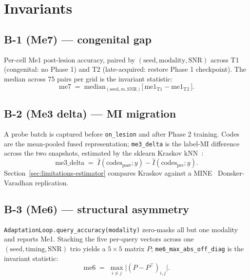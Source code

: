 \documentclass{article}
\begin{document}

\section{Invariants}
\label{sec:invariants}

\subsection{B-1 (Me7) --- congenital gap}

Per-cell Me1 post-lesion accuracy, paired by
$(\mathrm{seed}, \mathrm{modality}, \mathrm{SNR})$ across T1
(congenital: no Phase 1) and T2 (late-acquired: restore Phase 1
checkpoint). The median across 75 pairs per grid is the invariant
statistic:
\begin{equation}
\mathrm{me7} \;=\; \mathrm{median}_{(\mathrm{seed}, m, \mathrm{SNR})}
 \bigl[\, \mathrm{me1}_{\mathrm{T1}} - \mathrm{me1}_{\mathrm{T2}} \,\bigr].
\end{equation}

\subsection{B-2 (Me3 delta) --- MI migration}

A probe batch is captured before \texttt{on\_lesion} and after
Phase 2 training. Codes are the mean-pooled fused representation;
\texttt{me3\_delta} is the label-MI difference across the two
snapshots, estimated by the sklearn Kraskov
kNN~\citep{kraskov2004estimating}:
\begin{equation}
\mathrm{me3\_delta} \;=\; \widehat{I}(\mathrm{codes}_{\mathrm{post}}; y)
  - \widehat{I}(\mathrm{codes}_{\mathrm{pre}}; y).
\end{equation}
Section~\ref{sec:limitations-estimator} compares Kraskov against a
MINE~\citep{belghazi2018mine} Donsker-Varadhan replication.

\subsection{B-3 (Me6) --- structural asymmetry}

\texttt{AdaptationLoop.query\_accuracy(modality)} zero-masks all
but one modality and reports Me1. Stacking the five per-query
vectors across one $(\mathrm{seed}, \mathrm{timing}, \mathrm{SNR})$
trio yields a $5 \times 5$ matrix $P$;
\texttt{me6\_max\_abs\_off\_diag} is the invariant statistic:
\begin{equation}
\mathrm{me6} \;=\; \max_{i \neq j} \bigl| (P - P^{\top})_{i,j} \bigr|.
\end{equation}
\end{document}
